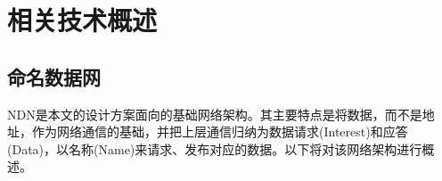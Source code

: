 % 
%
%
% 
%
\chapter{相关技术概述}
\label{RelatedChapter}

\section{命名数据网}
\par
NDN是本文的设计方案面向的基础网络架构。其主要特点是将数据，而不是地址，作为网络通信的基础，并把上层通信归纳为数据请求(Interest)和应答(Data)，以名称(Name)来请求、发布对应的数据\cite{NDNRefOriginal}。以下将对该网络架构进行概述。
